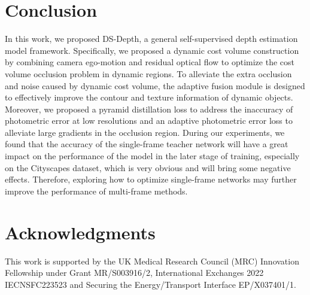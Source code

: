 \documentclass[journal]{IEEEtran}
\begin{document}
\section{Conclusion}
In this work, we proposed DS-Depth, a general self-supervised depth estimation model framework. Specifically, we proposed a dynamic cost volume construction by combining camera ego-motion and residual optical flow to optimize the cost volume occlusion problem in dynamic regions. To alleviate the extra occlusion and noise caused by dynamic cost volume, the adaptive fusion module is designed to effectively improve the contour and texture information of dynamic objects. Moreover, we proposed a pyramid distillation loss to address the inaccuracy of photometric error at low resolutions and an adaptive photometric error loss to alleviate large gradients in the occlusion region. During our experiments, we found that the accuracy of the single-frame teacher network will have a great impact on the performance of the model in the later stage of training, especially on the Cityscapes dataset, which is very obvious and will bring some negative effects. Therefore, exploring how to optimize single-frame networks may further improve the performance of multi-frame methods.


\section*{Acknowledgments}
This work is supported by the UK Medical Research Council (MRC) Innovation Fellowship under Grant MR/S003916/2, International Exchanges 2022 IECNSFC223523 and Securing the Energy/Transport Interface EP/X037401/1.















\end{document}

